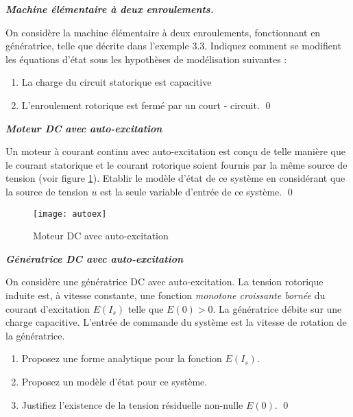 \begin{exercice}{\bf \em Machine élémentaire à deux enroulements.}

 On considère la machine élémentaire à deux enroulements, 
fonctionnant en génératrice, telle que décrite dans l'exemple 3.3.
Indiquez comment se modifient les équations d'état sous les
hypothèses de modélisation suivantes :
\begin{enumerate}
\item  La charge du circuit statorique est capacitive 
\item  L'enroulement rotorique est fermé par un court - circuit. \qed
\end{enumerate}
\end{exercice}
\vv

\begin{exercice}{\bf \em Moteur DC avec auto-excitation}

Un moteur à courant continu avec auto-excitation est conçu de
telle manière que le courant statorique et le courant rotorique soient
fournis par la même source de tension (voir figure \ref{fig:autoex}). Etablir le
modèle d'état de ce système en considérant que la source de
tension $u$ est la seule variable d'entrée de ce système. \qed
\begin{figure}[htbp]
\begin{center}
\texttt{[image: autoex]}
\caption{Moteur DC avec auto-excitation}
\label{fig:autoex}
\end{center}
\end{figure}
\end{exercice}
\vv

\begin{exercice}{\bf \em Génératrice DC avec auto-excitation}

On considère une génératrice DC avec auto-excitation. La tension
rotorique induite est, à vitesse constante, une fonction {\em monotone
croissante bornée} du courant d'excitation $E(I_s)$ telle que $E(0) >
0$. La génératrice débite sur une charge capacitive. L'entrée de
commande du système est la vitesse de rotation de la
génératrice.
\begin{enumerate}
\item Proposez une forme analytique pour la fonction $E(I_s)$.
\item Proposez un modèle d'état pour ce système.
\item Justifiez l'existence de la tension résiduelle non-nulle $E(0)$. \qed
\end{enumerate}
\end{exercice}
\vv

